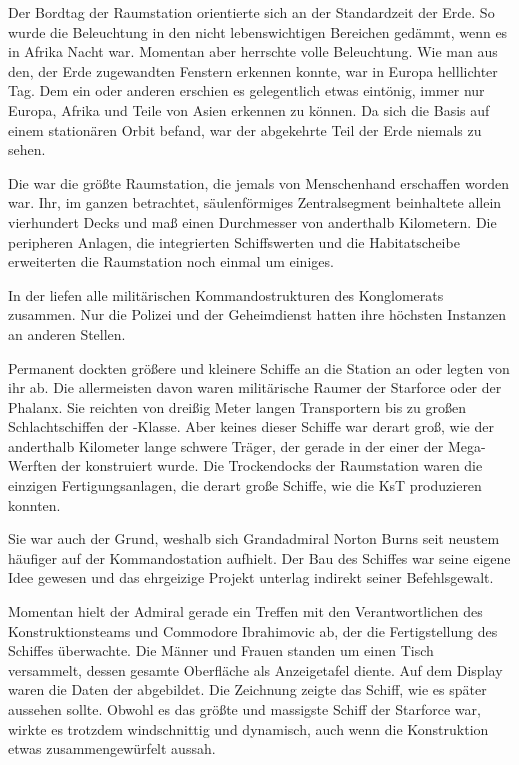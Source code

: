 Der Bordtag der Raumstation  orientierte sich an der Standardzeit der Erde. So wurde die Beleuchtung in den nicht lebenswichtigen Bereichen gedämmt, wenn es in Afrika Nacht war. Momentan aber herrschte volle Beleuchtung. Wie man aus den, der Erde zugewandten Fenstern erkennen konnte, war in Europa helllichter Tag. Dem ein oder anderen erschien es gelegentlich etwas eintönig, immer nur Europa, Afrika und Teile von Asien erkennen zu können. Da sich die Basis auf einem stationären Orbit befand, war der abgekehrte Teil der Erde niemals zu sehen.

\par

Die  war die größte Raumstation, die jemals von Menschenhand erschaffen worden war. Ihr, im ganzen betrachtet, säulenförmiges Zentralsegment beinhaltete allein vierhundert Decks und maß einen Durchmesser von anderthalb Kilometern. Die peripheren Anlagen, die integrierten Schiffswerten und die Habitatscheibe erweiterten die Raumstation noch einmal um einiges.

\par

In der  liefen alle militärischen Kommandostrukturen des Konglomerats zusammen. Nur die Polizei und der Geheimdienst hatten ihre höchsten Instanzen an anderen Stellen.

\par

Permanent dockten größere und kleinere Schiffe an die Station an oder legten von ihr ab. Die allermeisten davon waren militärische Raumer der Starforce oder der Phalanx. Sie reichten von dreißig Meter langen Transportern bis zu großen Schlachtschiffen der -Klasse. Aber keines dieser Schiffe war derart groß, wie der anderthalb Kilometer lange schwere Träger, der gerade in der einer der Mega-Werften der  konstruiert wurde. Die Trockendocks der Raumstation waren die einzigen Fertigungsanlagen, die derart große Schiffe, wie die  KsT produzieren konnten.

\par

Sie war auch der Grund, weshalb sich Grandadmiral Norton Burns seit neustem häufiger auf der Kommandostation aufhielt. Der Bau des Schiffes war seine eigene Idee gewesen und das ehrgeizige Projekt unterlag indirekt seiner Befehlsgewalt.

\par

Momentan hielt der Admiral gerade ein Treffen mit den Verantwortlichen des Konstruktionsteams und Commodore Ibrahimovic ab, der die Fertigstellung des Schiffes überwachte. Die Männer und Frauen standen um einen Tisch versammelt, dessen gesamte Oberfläche als Anzeigetafel diente. Auf dem Display waren die Daten der  abgebildet. Die Zeichnung zeigte das Schiff, wie es später aussehen sollte. Obwohl es das größte und massigste Schiff der Starforce war, wirkte es trotzdem windschnittig und dynamisch, auch wenn die Konstruktion etwas zusammengewürfelt aussah.

